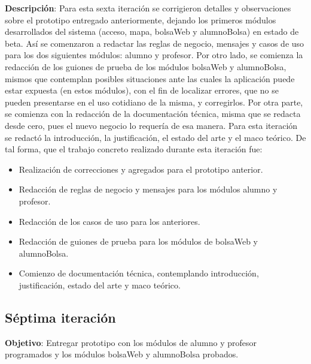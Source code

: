 \noindent
\textbf{Descripción}: Para esta sexta iteración se corrigieron detalles y observaciones sobre el prototipo entregado anteriormente, dejando los primeros módulos desarrollados del sistema (acceso, mapa, bolsaWeb y alumnoBolsa) en estado de beta. Así se comenzaron a redactar las reglas de negocio, mensajes y casos de uso para los dos siguientes módulos: alumno y profesor. Por otro lado, se comienza la redacción de los guiones de prueba de los módulos bolsaWeb y alumnoBolsa, mismos que contemplan posibles situaciones ante las cuales la aplicación puede estar expuesta (en estos módulos), con el fin de localizar errores, que no se pueden presentarse en el uso cotidiano de la misma, y corregirlos.
\newline
Por otra parte, se comienza con la redacción de la documentación técnica, misma que se redacta desde cero, pues el nuevo negocio lo requería de esa manera. Para esta iteración se redactó la introducción, la justificación, el estado del arte y el maco teórico.
\newline
De tal forma, que el trabajo concreto realizado durante esta iteración fue:
\begin{itemize}
	\item Realización de correcciones y agregados para el prototipo anterior.
	\item Redacción de reglas de negocio y mensajes para los módulos alumno y profesor.
	\item Redacción de los casos de uso para los anteriores.
	\item Redacción de guiones de prueba para los módulos de bolsaWeb y alumnoBolsa.
	\item Comienzo de documentación técnica, contemplando introducción, justificación, estado del arte y maco teórico.
\end{itemize}



\subsection{Séptima iteración}

\noindent
\textbf{Objetivo}: Entregar prototipo con los módulos de alumno y profesor programados y los módulos bolsaWeb y alumnoBolsa probados.
\newline


